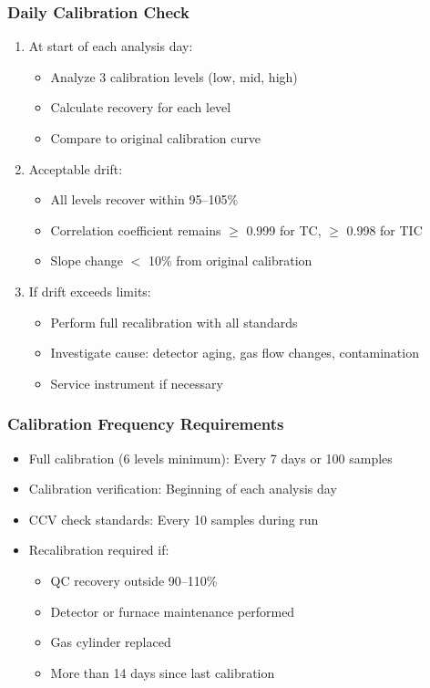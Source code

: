 \documentclass[11pt,a4paper]{article}\usepackage[]{graphicx}\usepackage[]{xcolor}
\begin{document}
\subsubsection{Daily Calibration Check}
\begin{enumerate}[noitemsep]
    \item At start of each analysis day:
    \begin{itemize}
        \item Analyze 3 calibration levels (low, mid, high)
        \item Calculate recovery for each level
        \item Compare to original calibration curve
    \end{itemize}
    \item Acceptable drift:
    \begin{itemize}
        \item All levels recover within 95--105\%
        \item Correlation coefficient remains $\geq$ 0.999 for TC, $\geq$ 0.998 for TIC
        \item Slope change $<$ 10\% from original calibration
    \end{itemize}
    \item If drift exceeds limits:
    \begin{itemize}
        \item Perform full recalibration with all standards
        \item Investigate cause: detector aging, gas flow changes, contamination
        \item Service instrument if necessary
    \end{itemize}
\end{enumerate}

\subsubsection{Calibration Frequency Requirements}
\begin{itemize}[noitemsep]
    \item Full calibration (6 levels minimum): Every 7 days or 100 samples
    \item Calibration verification: Beginning of each analysis day
    \item CCV check standards: Every 10 samples during run
    \item Recalibration required if:
    \begin{itemize}
        \item QC recovery outside 90--110\%
        \item Detector or furnace maintenance performed
        \item Gas cylinder replaced
        \item More than 14 days since last calibration
    \end{itemize}
\end{itemize}
\end{document}
